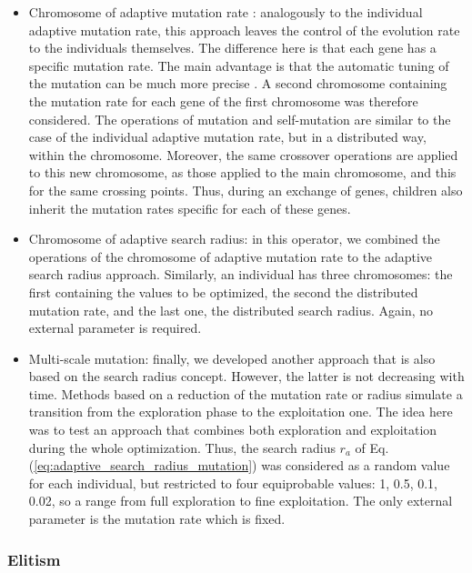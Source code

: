 \documentclass{ametsoc}
\begin{document}
\begin{itemize}
	\item Chromosome of adaptive mutation rate \citep[or \textit{n adaptative mutation rate},][]{Back1992a}: analogously to the individual adaptive mutation rate, this approach leaves the control of the evolution rate to the individuals themselves. The difference here is that each gene has a specific mutation rate. The main advantage is that the automatic tuning of the mutation can be much more precise \citep{Smith1997a}. A second chromosome containing the mutation rate for each gene of the first chromosome was therefore considered. The operations of mutation and self-mutation are similar to the case of the individual adaptive mutation rate, but in a distributed way, within the chromosome. Moreover, the same crossover operations are applied to this new chromosome, as those applied to the main chromosome, and this for the same crossing points. Thus, during an exchange of genes, children also inherit the mutation rates specific for each of these genes.
	
	\item Chromosome of adaptive search radius: in this operator, we combined the operations of the chromosome of adaptive mutation rate to the adaptive search radius approach. Similarly, an individual has three chromosomes: the first containing the values to be optimized, the second the distributed mutation rate, and the last one, the distributed search radius. Again, no external parameter is required.
	
	\item Multi-scale mutation: finally, we developed another approach that is also based on the search radius concept. However, the latter is not decreasing with time. Methods based on a reduction of the mutation rate or radius simulate a transition from the exploration phase to the exploitation one. The idea here was to test an approach that combines both exploration and exploitation during the whole optimization. Thus, the search radius $r_{a}$ of Eq. (\ref{eq:adaptive_search_radius_mutation}) was considered as a random value for each individual, but restricted to four equiprobable values: 1, 0.5, 0.1, 0.02, so a range from full exploration to fine exploitation. The only external parameter is the mutation rate which is fixed.
	
\end{itemize}


\subsubsection{Elitism}
\end{document}
